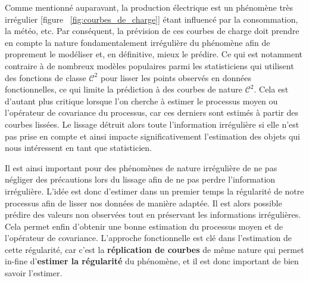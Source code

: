 Comme mentionné auparavant, la production électrique est un phénomène très irrégulier [figure ~\ref{fig:courbes_de_charge}] étant influencé par la consommation, la météo, etc. Par conséquent, la prévision de ces courbes de charge doit prendre en compte la nature fondamentalement irrégulière du phénomène afin de proprement le modéliser et, en définitive, mieux le prédire. 
Ce qui est notamment contraire à de nombreux modèles populaires parmi les statisticiens qui utilisent des fonctions de classe $\mathcal C^2$ pour lisser les points observés en données fonctionnelles, ce qui limite la prédiction à des courbes de nature $\mathcal C^2$. 
Cela est d'autant plus critique lorsque l'on cherche à estimer le processus moyen ou l'opérateur de covariance du processus, car ces derniers sont estimés à partir des courbes lissées. 
Le lissage détruit alors toute l'information irrégulière si elle n'est pas prise en compte et ainsi impacte significativement l'estimation des objets qui nous intéressent en tant que statisticien.



Il est ainsi important pour des phénomènes de nature irrégulière de ne pas négliger des précautions lors du lissage afin de ne pas perdre l'information irrégulière. L'idée est donc d'estimer dans un premier temps la régularité de notre processus afin de lisser nos données de manière adaptée. Il est alors possible prédire des valeurs non observées tout en préservant les informations irrégulières. Cela permet enfin d'obtenir une bonne estimation du processus moyen et de l'opérateur de covariance. L'approche fonctionnelle est clé dans l'estimation de cette régularité, car c'est la \textbf{réplication de courbes} de même nature qui permet in-fine d'\textbf{estimer la régularité} du phénomène, et il est donc important de bien savoir l'estimer.